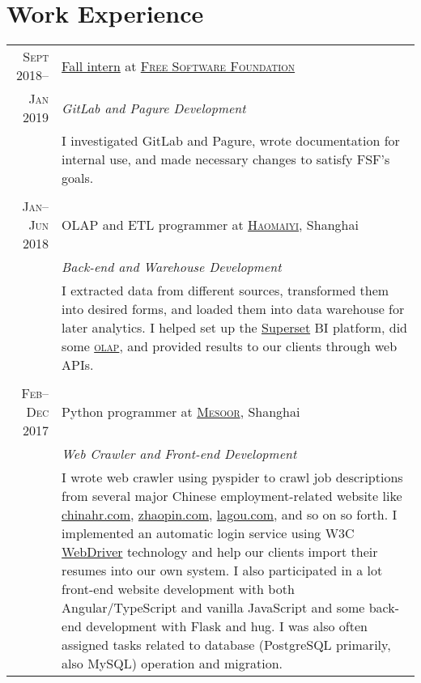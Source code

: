 \documentclass[a4paper,11pt]{article}
\begin{document}
\section{Work Experience}
\begin{tabularx}{.935\textwidth}{r|X}
  \textsc{Sept} 2018--   & \href{https://www.fsf.org/blogs/sysadmin/introducing-lei-zhao-intern-with-the-fsf-tech-team}{Fall intern} at \href{https://www.fsf.org/}{\scshape Free Software Foundation} \\
  \textsc{Jan} 2019      & \emph{GitLab and Pagure Development} \\
                         & \footnotesize I investigated GitLab and Pagure, wrote documentation for internal use, and made necessary changes to satisfy FSF's goals.\\
  \multicolumn{2}{c}{} \\
  \textsc{Jan--Jun} 2018 & OLAP and ETL programmer at \href{https://www.haomaiyi.com/}{\scshape Haomaiyi}, Shanghai \\
                         & \emph{Back-end and Warehouse Development} \\
                         & \footnotesize I extracted data from different sources, transformed them into desired forms, and loaded them into data warehouse for later analytics.  I helped set up the \href{https://superset.incubator.apache.org/}{Superset} BI platform, did some \href{https://en.wikipedia.org/wiki/Online_analytical_processing}{\scshape olap}, and provided results to our clients through web APIs.\\
  \multicolumn{2}{c}{} \\
  \textsc{Feb--Dec} 2017 & Python programmer at \href{https://www.mesoor.com/}{\scshape Mesoor}, Shanghai \\
                         & \emph{Web Crawler and Front-end Development}\\
                         & \footnotesize I wrote web crawler using pyspider to crawl job descriptions from several major Chinese employment-related website like \href{http://www.chinahr.com/}{chinahr.com}, \href{https://www.zhaopin.com/}{zhaopin.com}, \href{https://www.lagou.com/}{lagou.com}, and so on so forth.  I implemented an automatic login service using W3C \href{https://github.com/w3c/web-platform-tests/pull/6743}{WebDriver} technology and help our clients import their resumes into our own system.  I also participated in a lot front-end website development with both Angular/TypeScript and vanilla JavaScript and some back-end development with Flask and hug.  I was also often assigned tasks related to database (PostgreSQL primarily, also MySQL) operation and migration.\\

\end{tabularx}
\end{document}
